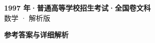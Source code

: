 \documentclass[zihao=-4, a4paper]{ctexart}
\begin{document}
\begin{center}
  {\Large\bfseries 1997 年·普通高等学校招生考试·全国卷文科}\\[4pt]
  {\large 数学 · 解析版}
\end{center}
\medskip
{}

\clearpage
{}
\begin{center}{\Large\bfseries 参考答案与详细解析}\end{center}
\medskip

\end{document}
